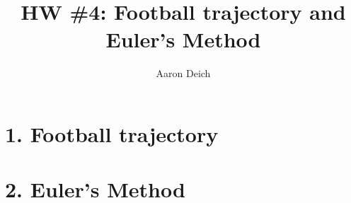 \documentclass{article}
\begin{document}
\title{HW \#4: Football trajectory and Euler's Method}
\author{Aaron Deich}

\maketitle

\section{1. Football trajectory}

\section{2. Euler's Method}




\end{document}
